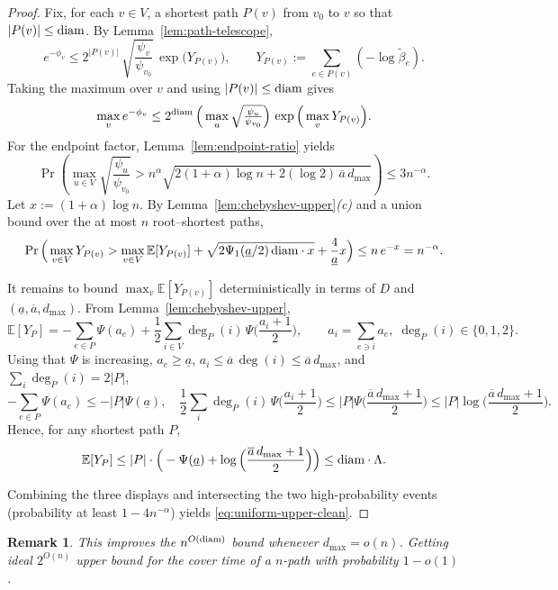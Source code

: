 \documentclass[a4paper, 11pt]{article}
\newcommand{\E}{\mathbb{E}}
\newcommand{\diam}{\textnormal{diam}}
\newtheorem{remark}{Remark}
\begin{document}
\begin{proof}
Fix, for each $v\in V$, a shortest path $P(v)$ from $v_0$ to $v$ so that $|P(v)|\le \diam$. By Lemma~\ref{lem:path-telescope},
\[
e^{-\phi_v}\le 2^{|P(v)|}\,\sqrt{\frac{\psi_v}{\psi_{v_0}}}\,\exp\big(Y_{P(v)}\big),
\qquad
Y_{P(v)}:=\sum_{e\in P(v)}(-\log\tilde\beta_e).
\]
Taking the maximum over $v$ and using $|P(v)|\le \diam$ gives
\[
\max_{v} e^{-\phi_v}\le 2^{\diam}\,\Big(\max_{u}\sqrt{\tfrac{\psi_u}{\psi_{v_0}}}\Big)\,\exp\Big(\max_{v} Y_{P(v)}\Big).
\]
For the endpoint factor, Lemma~\ref{lem:endpoint-ratio} yields
\[
\Pr\left(\max_{u\in V}\sqrt{\frac{\psi_u}{\psi_{v_0}}}> n^{\alpha}\sqrt{2(1+\alpha)\log n+2(\log 2)\,\overline{a}\,d_{\max}}\right)\le 3n^{-\alpha}.
\]
Let $x:=(1+\alpha)\log n$. By Lemma~\ref{lem:chebyshev-upper}\emph{(c)}
and a union bound over the at most $n$ root--shortest paths,
\[
\Pr\Big(\max_{v\in V}Y_{P(v)}
>\max_{v\in V}\E[Y_{P(v)}]+\sqrt{2\Psi_1(\underline{a}/2)\,\diam\cdot x}+\frac{4}{\underline{a}}x\Big)
\le n\,e^{-x}
= n^{-\alpha}.
\]

It remains to bound $\max_{v}\E[Y_{P(v)}]$ deterministically in terms of $D$ and $(\underline{a},\overline{a},d_{\max})$. From Lemma~\ref{lem:chebyshev-upper},
\[
\E[Y_{P}]
= -\sum_{e\in P}\Psi(a_e)+ \frac12\sum_{i\in V}\deg_P(i)\,\Psi\Big(\frac{a_i+1}{2}\Big),
\qquad a_i=\sum_{e\ni i}a_e,\;\deg_P(i)\in\{0,1,2\}.
\]
Using that $\Psi$ is increasing, $a_e\ge \underline{a}$, $a_i\le \overline{a}\,\deg(i)\le \overline{a}\,d_{\max}$, and $\sum_i\deg_P(i)=2|P|$,
\[
-\sum_{e\in P}\Psi(a_e)\le -|P|\Psi(\underline{a}),
\quad
\frac12\sum_{i}\deg_P(i)\,\Psi\Big(\frac{a_i+1}{2}\Big)
\le |P|\Psi\Big(\frac{\overline{a}\,d_{\max}+1}{2}\Big)
\le |P| \log\Big(\frac{\overline{a}\,d_{\max}+1}{2}\Big).
\]
Hence, for any shortest path $P$,
\[
\E[Y_P]\le |P|\cdot \Big(-\Psi(\underline{a})+\log\Big(\frac{\overline{a}\,d_{\max}+1}{2}\Big)\Big)
\le \diam\cdot\Lambda.
\]

Combining the three displays and intersecting the two high-probability events (probability at least $1-4n^{-\alpha}$) yields \eqref{eq:uniform-upper-clean}.
\end{proof}

\begin{remark}
This improves the $n^{O(\diam)}$ bound whenever $d_{\max} = o(n)$. Getting ideal $2^{O(n)}$ upper bound for the cover time of a $n$-path with probability $1-o(1)$.
\end{remark}

\vspace{.3em}
\end{document}
